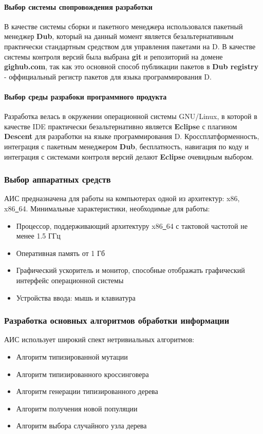 \documentclass[russian,utf8,emptystyle]{eskdtext}
\begin{document}
\paragraph{Выбор системы спопровождения разработки}
В качестве системы сборки и пакетного менеджера использовался пакетный менеджер \textbf{Dub}, который на данный момент является безальтернативным практически стандартным средством для управления пакетами на D. В качестве системы контроля версий была выбрана \textbf{git} и репозиторий на домене \textbf{gighub.com}, так как это основной способ публикации пакетов в \textbf{Dub registry} - оффициальный регистр пакетов для языка программирования D.

\paragraph{Выбор среды разрабоки программного продукта}
Разработка велась в окружении операционной системы GNU/Linux, в которой в качестве IDE практически безальтернативно является \textbf{Eclipse} с плагином \textbf{Descent} для разработки на языке программирования D. Кроссплатформенность, интеграция с пакетным менеджером \textbf{Dub}, бесплатность, навигация по коду и интеграция с системами контроля версий делают \textbf{Eclipse} очевидным выбором. 

\subsubsection{Выбор аппаратных средств}
АИС предназначена для работы на компьютерах одной из архитектур: x86, x86\underline{~}64. Минимальные характеристики, необходимые для работы:
\begin{itemize}
\item Процессор, поддерживающий архитектуру x86\underline{~}64 с тактовой частотой не менее 1.5 ГГц
\item Оперативная память от 1 Гб
\item Графический ускоритель и монитор, способные отображать графический интерфейс операционной системы
\item Устройства ввода: мышь и клавиатура
\end{itemize}

\subsubsection{Разработка основных алгоритмов обработки информации}
АИС использует широкий спект нетривиальных алгоритмов:
\begin{itemize}
\item Алгоритм типизированной мутации
\item Алгоритм типизированного кроссинговера
\item Алгоритм генерации типизированного дерева
\item Алгоритм получения новой популяции
\item Алгоритм выбора случайного узла дерева
\end{itemize}
\newpage
\end{document}
